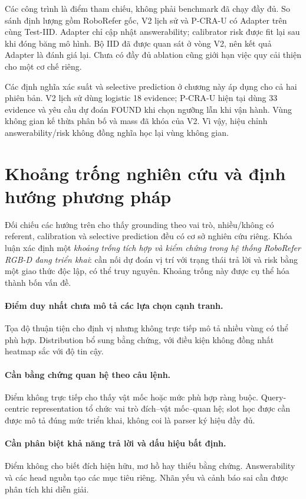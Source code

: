 Các công trình là điểm tham chiếu, không phải benchmark đã chạy đầy đủ. So sánh định lượng gồm RoboRefer gốc, V2 lịch sử và P-CRA-U có Adapter trên cùng Test-IID. Adapter chỉ cập nhật answerability; calibrator risk được fit lại sau khi đóng băng mô hình. Bộ IID đã được quan sát ở vòng V2, nên kết quả Adapter là đánh giá lại. Chưa có đầy đủ ablation cũng giới hạn việc quy cải thiện cho một cơ chế riêng.

Các định nghĩa xác suất và selective prediction ở chương này áp dụng cho
cả hai phiên bản. V2 lịch sử dùng logistic 18 evidence; P-CRA-U hiện tại
dùng 33 evidence và yêu cầu dự đoán FOUND khi chọn ngưỡng lẫn khi vận hành.
Vùng không gian kế thừa phân bố và mass đã khóa của V2. Vì vậy,
hiệu chỉnh answerability/risk không đồng nghĩa học lại vùng không gian.

\section{Khoảng trống nghiên cứu và định hướng phương pháp}
\label{sec:theory-gaps}

Đối chiếu các hướng trên cho thấy grounding theo vai trò, nhiều/không có referent, calibration và selective prediction đều có cơ sở nghiên cứu riêng. Khóa luận xác định một \emph{khoảng trống tích hợp và kiểm chứng trong hệ thống RoboRefer RGB-D đang triển khai}: cần nối dự đoán vị trí với trạng thái trả lời và risk bằng một giao thức độc lập, có thể truy nguyên. Khoảng trống này được cụ thể hóa thành bốn vấn đề.

\paragraph{Điểm duy nhất chưa mô tả các lựa chọn cạnh tranh.}
Tọa độ thuận tiện cho định vị nhưng không trực tiếp mô tả nhiều vùng có thể phù hợp. Distribution bổ sung bằng chứng, với điều kiện không đồng nhất heatmap sắc với độ tin cậy.

\paragraph{Cần bằng chứng quan hệ theo câu lệnh.}
Điểm không trực tiếp cho thấy vật mốc hoặc mức phù hợp ràng buộc. Query-centric representation tổ chức vai trò đích--vật mốc--quan hệ; slot học được cần được mô tả đúng mức triển khai, không coi là parser ký hiệu đầy đủ.

\paragraph{Cần phân biệt khả năng trả lời và dấu hiệu bất định.}
Điểm không cho biết đích hiện hữu, mơ hồ hay thiếu bằng chứng. Answerability và các head nguồn tạo các mục tiêu riêng. Nhãn yếu và cảnh báo sai cần được phân tích khi diễn giải.

